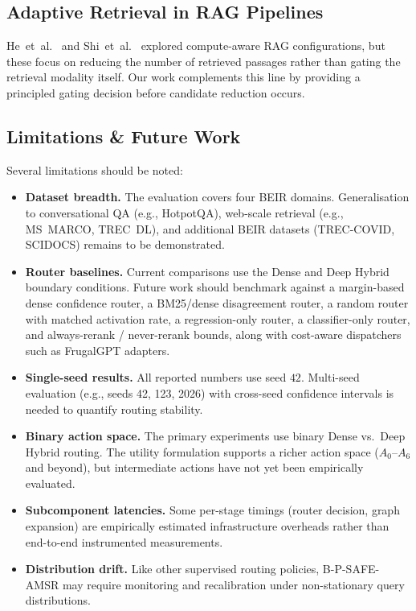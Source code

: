 \documentclass[journal]{IEEEtran}
\begin{document}
\subsection{Adaptive Retrieval in RAG Pipelines}

He~et~al.~\cite{he2021efficient} and Shi~et~al.\
\cite{shi2024replug} explored compute-aware RAG configurations,
but these focus on reducing the number of retrieved passages
rather than gating the retrieval modality itself. Our work
complements this line by providing a principled gating decision
before candidate reduction occurs.

\subsection{Limitations \& Future Work}
\label{sec:limitations}

Several limitations should be noted:

\begin{itemize}
    \item \textbf{Dataset breadth.} The evaluation covers four BEIR
          domains. Generalisation to conversational QA (e.g.,
          HotpotQA), web-scale retrieval (e.g., MS~MARCO,
          TREC~DL), and additional BEIR datasets (TREC-COVID,
          SCIDOCS) remains to be demonstrated.
    \item \textbf{Router baselines.} Current comparisons use the
          Dense and Deep Hybrid boundary conditions. Future work
          should benchmark against a margin-based dense confidence router,
          a BM25/dense disagreement router, a random router with matched
          activation rate, a regression-only router, a classifier-only
          router, and always-rerank / never-rerank bounds, along with
          cost-aware dispatchers such as FrugalGPT adapters.
    \item \textbf{Single-seed results.} All reported numbers use
          seed $42$. Multi-seed evaluation (e.g., seeds 42, 123,
          2026) with cross-seed confidence intervals is needed to
          quantify routing stability.
    \item \textbf{Binary action space.} The primary experiments
          use binary Dense vs.\ Deep Hybrid routing. The utility
          formulation supports a richer action space ($A_0$--$A_6$
          and beyond), but intermediate actions have not yet been
          empirically evaluated.
    \item \textbf{Subcomponent latencies.} Some per-stage timings
          (router decision, graph expansion) are empirically
          estimated infrastructure overheads rather than
          end-to-end instrumented measurements.
    \item \textbf{Distribution drift.} Like other supervised
          routing policies, B-P-SAFE-AMSR may require monitoring
          and recalibration under non-stationary query distributions.
\end{itemize}
\end{document}
